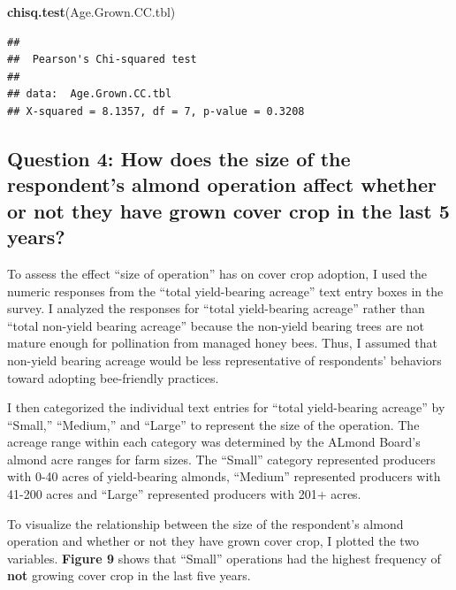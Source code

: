 \documentclass[12pt,]{article}
\newenvironment{Shaded}{\begin{snugshade}}{\end{snugshade}}
\newcommand{\KeywordTok}[1]{\textcolor[rgb]{0.13,0.29,0.53}{\textbf{#1}}}
\newcommand{\StringTok}[1]{\textcolor[rgb]{0.31,0.60,0.02}{#1}}
\newcommand{\OperatorTok}[1]{\textcolor[rgb]{0.81,0.36,0.00}{\textbf{#1}}}
\newcommand{\NormalTok}[1]{#1}
\begin{document}
\begin{Shaded}
\begin{Highlighting}[]
\KeywordTok{chisq.test}\NormalTok{(Age.Grown.CC.tbl)}
\end{Highlighting}
\end{Shaded}

\begin{verbatim}
## 
##  Pearson's Chi-squared test
## 
## data:  Age.Grown.CC.tbl
## X-squared = 8.1357, df = 7, p-value = 0.3208
\end{verbatim}

\FloatBarrier

\subsection{Question 4: How does the size of the respondent's almond
operation affect whether or not they have grown cover crop in the last 5
years?}\label{question-4-how-does-the-size-of-the-respondents-almond-operation-affect-whether-or-not-they-have-grown-cover-crop-in-the-last-5-years}

To assess the effect ``size of operation'' has on cover crop adoption, I
used the numeric responses from the ``total yield-bearing acreage'' text
entry boxes in the survey. I analyzed the responses for ``total
yield-bearing acreage'' rather than ``total non-yield bearing acreage''
because the non-yield bearing trees are not mature enough for
pollination from managed honey bees. Thus, I assumed that non-yield
bearing acreage would be less representative of respondents' behaviors
toward adopting bee-friendly practices.

I then categorized the individual text entries for ``total yield-bearing
acreage'' by ``Small,'' ``Medium,'' and ``Large'' to represent the size
of the operation. The acreage range within each category was determined
by the ALmond Board's almond acre ranges for farm sizes. The ``Small''
category represented producers with 0-40 acres of yield-bearing almonds,
``Medium'' represented producers with 41-200 acres and ``Large''
represented producers with 201+ acres.

To visualize the relationship between the size of the respondent's
almond operation and whether or not they have grown cover crop, I
plotted the two variables. \textbf{Figure 9} shows that ``Small''
operations had the highest frequency of \textbf{not} growing cover crop
in the last five years.

\begin{Shaded}
\end{Shaded}
\end{document}
